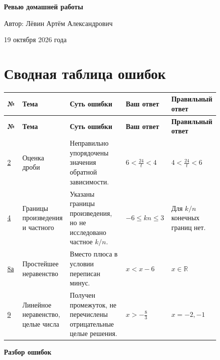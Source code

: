 \documentclass[12pt,a4paper]{article}
\begin{document}
\thispagestyle{empty}
\vspace*{0.27\textheight}
\begin{center}
{\Huge\bfseries Ревью домашней работы}\par
\vspace{1.7cm}
{\large Автор: Лёвин Артём Александрович}\par
\vspace{0.7cm}
{\large 19 октября 2026 года}
\end{center}
\vfill
\begin{center}
\end{center}
\newpage
\section*{Сводная таблица ошибок}
\small
\begin{longtable}{@{}>{\centering\arraybackslash}p{0.075\linewidth}p{0.17\linewidth}p{0.26\linewidth}p{0.18\linewidth}p{0.18\linewidth}@{}}
\toprule
\textbf{№} & \textbf{Тема} & \textbf{Суть ошибки} & \textbf{Ваш ответ} & \textbf{Правильный ответ}\\
\midrule
\endfirsthead
\toprule
\textbf{№} & \textbf{Тема} & \textbf{Суть ошибки} & \textbf{Ваш ответ} & \textbf{Правильный ответ}\\
\midrule
\endhead
\hyperref[task:2]{2} & Оценка дроби & Неправильно упорядочены значения обратной зависимости. & $6<\frac{24}{t}<4$ & $4<\frac{24}{t}<6$ \\
\hyperref[task:4]{4} & Границы произведения и частного & Указаны границы произведения, но не исследовано частное $k/n$. & $-6\le kn\le3$ & Для $k/n$ конечных границ нет. \\
\hyperref[task:8a]{8а} & Простейшее неравенство & Вместо плюса в условии переписан минус. & $x<x-6$ & $x\in\mathbb R$ \\
\hyperref[task:9]{9} & Линейное неравенство, целые числа & Получен промежуток, не перечислены отрицательные целые решения. & $x>-\frac83$ & $x=-2,-1$ \\
\bottomrule
\end{longtable}
\normalsize
\newpage
\thispagestyle{empty}
\vspace*{\fill}
\begin{center}
{\LARGE\bfseries Разбор ошибок}
\end{center}
\vspace*{\fill}
\end{document}

